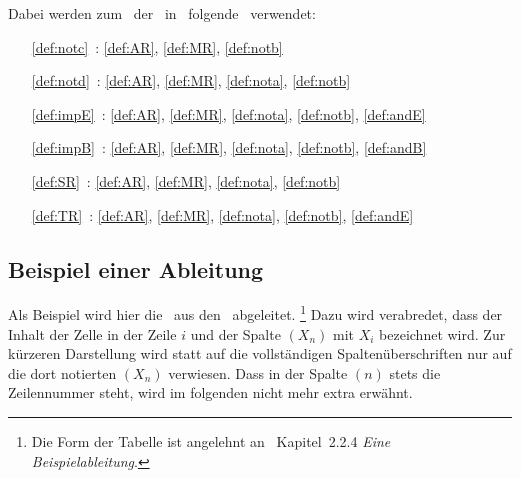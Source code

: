{Dabei werden zum \Beweis\ der \Schlussregeln\ in~\cite{bib:Rautenberg} folgende \Basisregeln\ verwendet:
\begin{itemize}
	\renewcommand*{\itemindent}{1cm}
	\renewcommand*{\labelsep}{5pt}
	\item[\ref{def:notc}~:] \ref{def:AR}, \ref{def:MR}, \ref{def:notb}
	\item[\ref{def:notd}~:] \ref{def:AR}, \ref{def:MR}, \ref{def:nota}, \ref{def:notb}
	\item[\ref{def:impE}~:] \ref{def:AR}, \ref{def:MR}, \ref{def:nota}, \ref{def:notb}, \ref{def:andE}
	\item[\ref{def:impB}~:] \ref{def:AR}, \ref{def:MR}, \ref{def:nota}, \ref{def:notb}, \ref{def:andB}
	\item[\ref{def:SR}~:]   \ref{def:AR}, \ref{def:MR}, \ref{def:nota}, \ref{def:notb}
	\item[\ref{def:TR}~:]   \ref{def:AR}, \ref{def:MR}, \ref{def:nota}, \ref{def:notb}, \ref{def:andE}
\end{itemize}
%
\subsection{Beispiel einer Ableitung}%
\label{sub:BeispielAbleitung}

Als Beispiel wird hier die \Schnittregel\ aus den \Basisregeln\ abgeleitet.%
\footnote{%
	Die Form der Tabelle ist angelehnt an~\cite{bib:NatuerlichesSchliessen} Kapitel~2.2.4 \emph{Eine Beispielableitung}.
}
Dazu wird verabredet, dass  der Inhalt der Zelle in der Zeile $i$ und der Spalte $(X_n)$ mit $X_i$ bezeichnet wird.
Zur kürzeren Darstellung wird statt auf die vollständigen Spaltenüberschriften nur auf die dort notierten $(X_n)$ verwiesen. Dass in der Spalte $(n)$ stets die Zeilennummer steht, wird im folgenden nicht mehr extra erwähnt.

}
